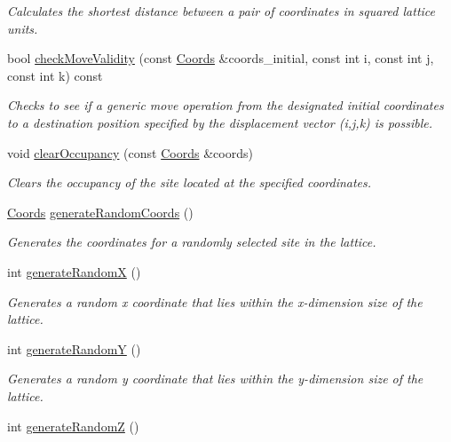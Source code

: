 \begin{DoxyCompactItemize}
\begin{DoxyCompactList}\small\item\em Calculates the shortest distance between a pair of coordinates in squared lattice units. \end{DoxyCompactList}\item 
bool \hyperlink{class_lattice_ad0592298c4b92e9e84a768b95cd6d0f0}{check\+Move\+Validity} (const \hyperlink{struct_coords}{Coords} \&coords\+\_\+initial, const int i, const int j, const int k) const
\begin{DoxyCompactList}\small\item\em Checks to see if a generic move operation from the designated initial coordinates to a destination position specified by the displacement vector (i,j,k) is possible. \end{DoxyCompactList}\item 
void \hyperlink{class_lattice_a97a1b4f24cd40b81ed63aa2d7713b63b}{clear\+Occupancy} (const \hyperlink{struct_coords}{Coords} \&coords)
\begin{DoxyCompactList}\small\item\em Clears the occupancy of the site located at the specified coordinates. \end{DoxyCompactList}\item 
\hyperlink{struct_coords}{Coords} \hyperlink{class_lattice_a9fbb3c8bc23999ff685b6837beb62606}{generate\+Random\+Coords} ()
\begin{DoxyCompactList}\small\item\em Generates the coordinates for a randomly selected site in the lattice. \end{DoxyCompactList}\item 
int \hyperlink{class_lattice_ab78435e50e3bf9f376c04fc305785bb4}{generate\+RandomX} ()
\begin{DoxyCompactList}\small\item\em Generates a random x coordinate that lies within the x-\/dimension size of the lattice. \end{DoxyCompactList}\item 
int \hyperlink{class_lattice_a180a9d79a40b1a0a092c8ab489569700}{generate\+RandomY} ()
\begin{DoxyCompactList}\small\item\em Generates a random y coordinate that lies within the y-\/dimension size of the lattice. \end{DoxyCompactList}\item 
int \hyperlink{class_lattice_a96006397a6ab389fb1eee87fde6e2165}{generate\+RandomZ} ()

\end{DoxyCompactItemize}
